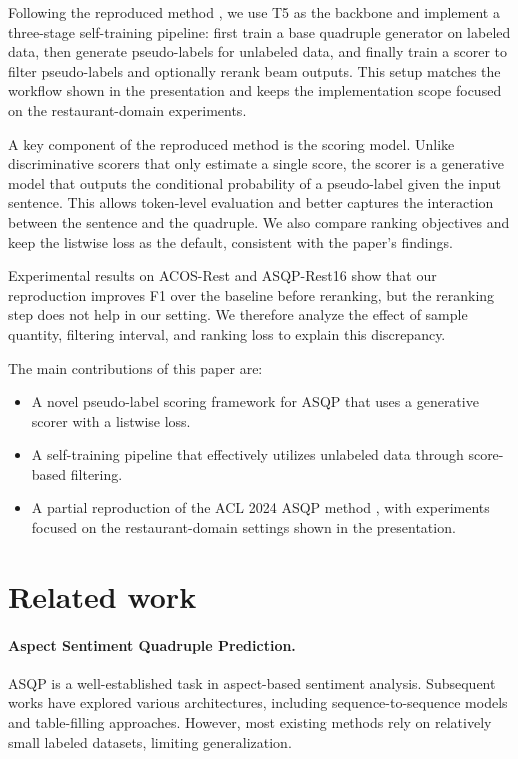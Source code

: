 \documentclass{article}
\begin{document}
Following the reproduced method \citep{zhang-etal-2024-self-training}, we use T5 as the backbone and implement a three-stage self-training pipeline: first train a base quadruple generator on labeled data, then generate pseudo-labels for unlabeled data, and finally train a scorer to filter pseudo-labels and optionally rerank beam outputs. This setup matches the workflow shown in the presentation and keeps the implementation scope focused on the restaurant-domain experiments.

A key component of the reproduced method is the scoring model. Unlike discriminative scorers that only estimate a single score, the scorer is a generative model that outputs the conditional probability of a pseudo-label given the input sentence. This allows token-level evaluation and better captures the interaction between the sentence and the quadruple. We also compare ranking objectives and keep the listwise loss as the default, consistent with the paper's findings.

Experimental results on ACOS-Rest and ASQP-Rest16 show that our reproduction improves F1 over the baseline before reranking, but the reranking step does not help in our setting. We therefore analyze the effect of sample quantity, filtering interval, and ranking loss to explain this discrepancy.

The main contributions of this paper are:
\begin{itemize}
    \item A novel pseudo-label scoring framework for ASQP that uses a generative scorer with a listwise loss.
    \item A self-training pipeline that effectively utilizes unlabeled data through score-based filtering.
    \item A partial reproduction of the ACL 2024 ASQP method \citep{zhang-etal-2024-self-training}, with experiments focused on the restaurant-domain settings shown in the presentation.
\end{itemize}

\section{Related work}

\paragraph{Aspect Sentiment Quadruple Prediction.}
ASQP is a well-established task in aspect-based sentiment analysis. Subsequent works have explored various architectures, including sequence-to-sequence models and table-filling approaches. However, most existing methods rely on relatively small labeled datasets, limiting generalization.
\end{document}
